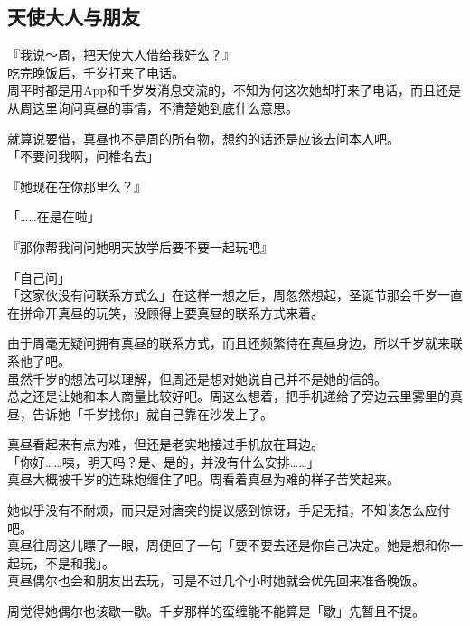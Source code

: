 \subsection{天使大人与朋友}

『我说～周，把天使大人借给我好么？』\\

吃完晚饭后，千岁打来了电话。\\

周平时都是用App和千岁发消息交流的，不知为何这次她却打来了电话，而且还是从周这里询问真昼的事情，不清楚她到底什么意思。

就算说要借，真昼也不是周的所有物，想约的话还是应该去问本人吧。\\

「不要问我啊，问椎名去」

『她现在在你那里么？』

「……在是在啦」

『那你帮我问问她明天放学后要不要一起玩吧』

「自己问」\\

「这家伙没有问联系方式么」在这样一想之后，周忽然想起，圣诞节那会千岁一直在拼命开真昼的玩笑，没顾得上要真昼的联系方式来着。

由于周毫无疑问拥有真昼的联系方式，而且还频繁待在真昼身边，所以千岁就来联系他了吧。\\

虽然千岁的想法可以理解，但周还是想对她说自己并不是她的信鸽。\\

总之还是让她和本人商量比较好吧。周这么想着，把手机递给了旁边云里雾里的真昼，告诉她「千岁找你」就自己靠在沙发上了。

真昼看起来有点为难，但还是老实地接过手机放在耳边。\\

「你好……咦，明天吗？是、是的，并没有什么安排……」\\

真昼大概被千岁的连珠炮缠住了吧。周看着真昼为难的样子苦笑起来。

她似乎没有不耐烦，而只是对唐突的提议感到惊讶，手足无措，不知该怎么应付吧。\\

真昼往周这儿瞟了一眼，周便回了一句「要不要去还是你自己决定。她是想和你一起玩，不是和我」。\\

真昼偶尔也会和朋友出去玩，可是不过几个小时她就会优先回来准备晚饭。

周觉得她偶尔也该歇一歇。千岁那样的蛮缠能不能算是「歇」先暂且不提。\\

